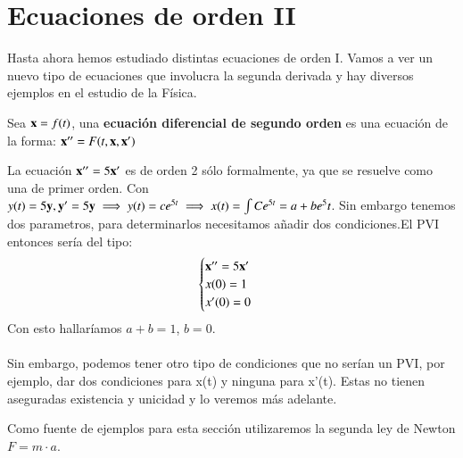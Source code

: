 
\section{Ecuaciones de orden II}
Hasta ahora hemos estudiado distintas ecuaciones de orden I. Vamos a ver un nuevo tipo de ecuaciones que involucra la segunda derivada y hay diversos ejemplos en el estudio de la Física.

\begin{dfn}
    Sea $\mathbf{x} = f(t)$, una \textbf{ecuación diferencial de segundo orden} es una ecuación de la forma: $\mathbf{x}'' = F(t, \mathbf{x}, \mathbf{x}')$
\end{dfn}

\begin{obs}
    La ecuación $\mathbf{x}'' = 5\mathbf{x}'$ es de orden 2 sólo formalmente, ya que se resuelve como una de primer orden. Con $y(t) = 5\mathbf{y}, \mathbf{y}' = 5\mathbf{y} \implies y(t) = ce^{5t} \implies x(t) = \int C e^{5t} = a + b e^5t$. Sin embargo tenemos dos parametros, para determinarlos necesitamos añadir dos condiciones.El PVI entonces sería del tipo:
    $$
        \begin{cases}
            \mathbf{x}'' = 5\mathbf{x}'\\
            x(0) = 1\\
            x'(0) = 0
        \end{cases}
    $$
    Con esto hallaríamos $a+b = 1$, $b=0$.\\\\
    Sin embargo, podemos tener otro tipo de condiciones que no serían un PVI, por ejemplo, dar dos condiciones para x(t) y ninguna para x'(t). Estas no tienen aseguradas existencia y unicidad y lo veremos más adelante.
\end{obs}

Como fuente de ejemplos para esta sección utilizaremos la segunda ley de Newton $F = m\cdot a$.

